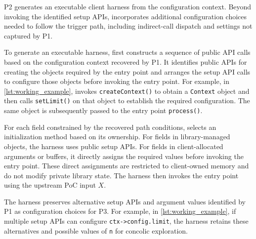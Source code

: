 P2 generates an executable client harness from the configuration context. Beyond invoking the identified setup APIs, \sys incorporates additional configuration choices needed to follow the trigger path, including indirect-call dispatch and settings not captured by P1.

To generate an executable harness, \sys first constructs a sequence of public API calls based on the configuration context recovered by P1.
%
It identifies public APIs for creating the objects required by the entry point and arranges the setup API calls to configure those objects before invoking the entry point.
For example, in \autoref{lst:working_example}, \sys invokes \texttt{createContext()} to obtain a \texttt{Context} object and then calls \texttt{setLimit()} on that object to establish the required configuration.
The same object is subsequently passed to the entry point \texttt{process()}.

For each field constrained by the recovered path conditions, \sys selects an initialization method based on its ownership.
For fields in library-managed objects, the harness uses public setup APIs.
For fields in client-allocated arguments or buffers, it directly assigns the required values before invoking the entry point.
These direct assignments are restricted to client-owned memory and do not modify private library state.
The harness then invokes the entry point using the upstream PoC input $X$.

The harness preserves alternative setup APIs and argument values identified by P1 as configuration choices for P3.
For example, in \autoref{lst:working_example}, if multiple setup APIs can configure \texttt{ctx->config.limit}, the harness retains these alternatives and possible values of \texttt{n} for concolic exploration.

